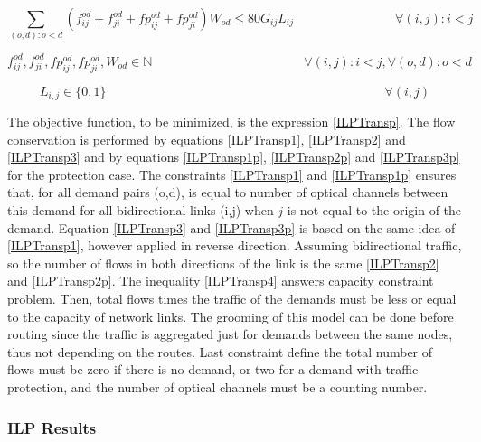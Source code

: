 \begin{equation}
\sum_{(o,d):o<d} \left(f_{ij}^{od} + f_{ji}^{od} + fp_{ij}^{od} + fp_{ji}^{od}\right) W_{od} \leq 80 G_{ij} L_{ij} \qquad \qquad \qquad \qquad
\forall(i,j) : i < j
\label{ILPTransp4}
\end{equation}

\begin{equation}
f_{ij}^{od} , f_{ji}^{od} , fp_{ij}^{od} , fp_{ji}^{od} , W_{od} \in \mathbb{N}   \qquad \qquad \qquad \qquad \qquad \qquad
\forall(i,j) : i < j, \forall(o,d) : o < d
\label{ILPTransp5}
\end{equation}

\begin{equation}
L_{i,j} \in \{0,1\} \qquad \qquad \qquad \qquad \qquad \qquad \qquad \qquad \qquad \qquad \qquad
\forall(i,j)
\label{ILPTranspL1}
\end{equation}

\vspace{11pt}
The objective function, to be minimized, is the expression \ref{ILPTransp}. The flow conservation is performed by equations \ref{ILPTransp1}, \ref{ILPTransp2} and \ref{ILPTransp3} and by equations \ref{ILPTransp1p}, \ref{ILPTransp2p} and \ref{ILPTransp3p} for the protection case. The constraints \ref{ILPTransp1} and \ref{ILPTransp1p} ensures that, for all demand pairs (o,d), is equal to number of optical channels between this demand for all bidirectional links (i,j) when $j$ is not equal to the origin of the demand. Equation \ref{ILPTransp3} and \ref{ILPTransp3p} is based on the same idea of \ref{ILPTransp1}, however applied in reverse direction. Assuming bidirectional traffic, so the number of flows in both directions of the link is the same \ref{ILPTransp2} and \ref{ILPTransp2p}. The inequality \ref{ILPTransp4} answers capacity constraint problem. Then, total flows times the traffic of the demands must be less or equal to the capacity of network links. The grooming of this model can be done before routing since the traffic is aggregated just for demands between the same nodes, thus not depending on the routes. Last constraint define the total number of flows must be zero if there is no demand, or two for a demand with traffic protection, and the number of optical channels must be a counting number.\\

\subsubsection{ILP Results}

